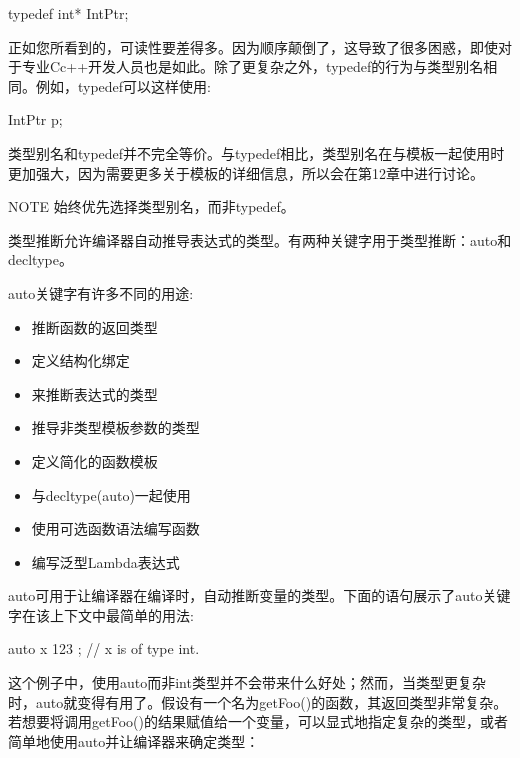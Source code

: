 \begin{cpp}
typedef int* IntPtr;
\end{cpp}

正如您所看到的，可读性要差得多。因为顺序颠倒了，这导致了很多困惑，即使对于专业Cc++开发人员也是如此。除了更复杂之外，typedef的行为与类型别名相同。例如，typedef可以这样使用:

\begin{cpp}
IntPtr p;
\end{cpp}

类型别名和typedef并不完全等价。与typedef相比，类型别名在与模板一起使用时更加强大，因为需要更多关于模板的详细信息，所以会在第12章中进行讨论。

\begin{myNotic}{NOTE}
始终优先选择类型别名，而非typedef。
\end{myNotic}


类型推断允许编译器自动推导表达式的类型。有两种关键字用于类型推断：auto和decltype。


auto关键字有许多不同的用途:

\begin{itemize}
\item
推断函数的返回类型

\item
定义结构化绑定

\item
来推断表达式的类型

\item
推导非类型模板参数的类型

\item
定义简化的函数模板

\item
与decltype(auto)一起使用

\item
使用可选函数语法编写函数

\item
编写泛型Lambda表达式
\end{itemize}

auto可用于让编译器在编译时，自动推断变量的类型。下面的语句展示了auto关键字在该上下文中最简单的用法:

\begin{cpp}
auto x { 123 }; // x is of type int.
\end{cpp}

这个例子中，使用auto而非int类型并不会带来什么好处；然而，当类型更复杂时，auto就变得有用了。假设有一个名为getFoo()的函数，其返回类型非常复杂。若想要将调用getFoo()的结果赋值给一个变量，可以显式地指定复杂的类型，或者简单地使用auto并让编译器来确定类型：

